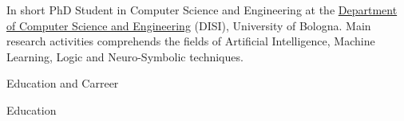 \documentclass{resume} %
\begin{document}
    
    \begin{rSection}{In short}
        PhD Student in Computer Science and Engineering at the \href{https://disi.unibo.it/it}{Department of Computer Science and Engineering} (DISI), University of Bologna.
        Main research activities comprehends the fields of Artificial Intelligence, Machine Learning, Logic and Neuro-Symbolic techniques.
        
    \end{rSection}
    
    \begin{rSection}{Education and Carreer}

        
        \begin{rSubsection}{Education}{}{}{}


\end{rSubsection}
\end{rSection}
\end{document}
